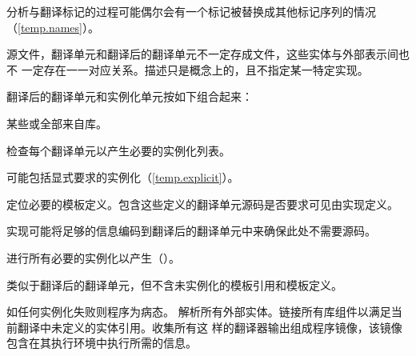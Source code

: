 \begin{enumerate}[label={\arabic*}]
    \begin{note} %
      分析与翻译标记的过程可能偶尔会有一个标记被替换成其他标记序列的情况
      （\ref{temp.names}）。
    \end{note}

    \begin{note} %
      源文件，翻译单元和翻译后的翻译单元不一定存成文件，这些实体与外部表示间也不
      一定存在一一对应关系。描述只是概念上的，且不指定某一特定实现。
    \end{note}
  \tpit %
    翻译后的翻译单元和实例化单元按如下组合起来：

    \begin{note} %
      某些或全部来自库。
    \end{note}

    检查每个翻译单元以产生必要的实例化列表。

    \begin{note} %
      可能包括显式要求的实例化（\ref{temp.explicit}）。
    \end{note}

    定位必要的模板定义。包含这些定义的翻译单元源码是否要求可见由实现定义。

    \begin{note} %
      实现可能将足够的信息编码到翻译后的翻译单元中来确保此处不需要源码。
    \end{note}

    进行所有必要的实例化以产生（）。

    \begin{note} %
      类似于翻译后的翻译单元，但不含未实例化的模板引用和模板定义。
    \end{note}

    如任何实例化失败则程序为病态。
  \tpit %
    解析所有外部实体。链接所有库组件以满足当前翻译中未定义的实体引用。收集所有这
    样的翻译器输出组成程序镜像，该镜像包含在其执行环境中执行所需的信息。
\end{enumerate}

